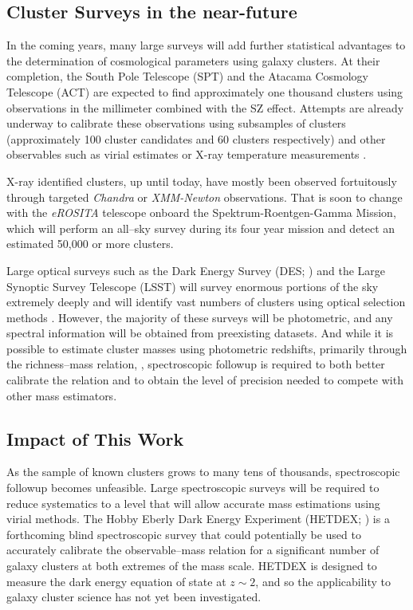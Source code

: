 \documentclass[12pt]{article}
\begin{document}
\subsection{Cluster Surveys in the near-future}
In the coming years, many large surveys will add further statistical advantages to the determination of cosmological parameters using galaxy clusters. At their completion, the South Pole Telescope (SPT) and the Atacama Cosmology Telescope (ACT) are expected to find approximately one thousand clusters using observations in the millimeter combined with the SZ effect. Attempts are already underway to calibrate these observations using subsamples of clusters (approximately 100 cluster candidates and 60 clusters respectively) and other observables such as virial estimates or X-ray temperature measurements . 

X-ray identified clusters, up until today, have mostly been observed fortuitously through targeted \textit{Chandra} or \textit{XMM-Newton} observations. That is soon to change with the \textit{eROSITA} telescope onboard the Spektrum-Roentgen-Gamma Mission, which will perform an all--sky survey during its four year mission and detect an estimated 50,000 or more clusters.

Large optical surveys such as the Dark Energy Survey (DES; \citealt{DES2005}) and the Large Synoptic Survey Telescope (LSST) will survey enormous portions of the sky extremely deeply and will identify vast numbers of clusters using optical selection methods . However, the majority of these surveys will be photometric, and any spectral information will be obtained from preexisting datasets. And while it is possible to estimate cluster masses using photometric redshifts, primarily through the richness--mass relation,  , spectroscopic followup is required to both better calibrate the relation and to obtain the level of precision needed to compete with other mass estimators. 

\subsection{Impact of This Work}
As the sample of known clusters grows to many tens of thousands, spectroscopic followup becomes unfeasible. Large spectroscopic surveys will be required to reduce systematics to a level that will allow accurate mass estimations using virial methods. The Hobby Eberly Dark Energy Experiment (HETDEX; \citealt{Hill2008}) is a forthcoming blind spectroscopic survey that could potentially be used to accurately calibrate the observable--mass relation for a significant number of galaxy clusters at both extremes of the mass scale. HETDEX is designed to measure the dark energy equation of state at $z\sim2$, and so the applicability to galaxy cluster science has not yet been investigated.
\end{document}
